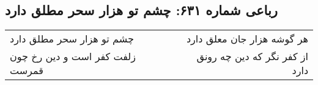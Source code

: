 \begin{center}
\section*{رباعی شماره ۶۳۱: چشم تو هزار سحر مطلق دارد}
\label{sec:0631}
\begin{longtable}{l p{0.5cm} r}
چشم تو هزار سحر مطلق دارد
&&
هر گوشه هزار جان معلق دارد
\\
زلفت کفر است و دین رخ چون قمرست
&&
از کفر نگر که دین چه رونق دارد
\\
\end{longtable}
\end{center}
